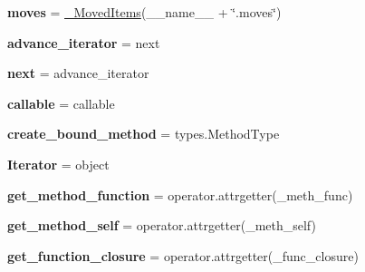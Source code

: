 \begin{DoxyCompactItemize}
\mbox{\label{namespacesetuptools_1_1__vendor_1_1six_aa576da7d145eb931842fccae3485b577}} 
{\bfseries moves} = \hyperlink{classsetuptools_1_1__vendor_1_1six_1_1___moved_items}{\+\_\+\+Moved\+Items}(\+\_\+\+\_\+name\+\_\+\+\_\+ + \char`\"{}.moves\char`\"{})
\item 
\mbox{\label{namespacesetuptools_1_1__vendor_1_1six_a095fbb8b34e358895d36999a87cdf374}} 
{\bfseries advance\+\_\+iterator} = next
\item 
\mbox{\label{namespacesetuptools_1_1__vendor_1_1six_ac7f0484b4e655ede4b52ca9442ae498f}} 
{\bfseries next} = advance\+\_\+iterator
\item 
\mbox{\label{namespacesetuptools_1_1__vendor_1_1six_ad65726eda446de9ea6f4036a61ea63af}} 
{\bfseries callable} = callable
\item 
\mbox{\label{namespacesetuptools_1_1__vendor_1_1six_aa2f3939cf1024da43126ad39b5ef5535}} 
{\bfseries create\+\_\+bound\+\_\+method} = types.\+Method\+Type
\item 
\mbox{\label{namespacesetuptools_1_1__vendor_1_1six_a6a5504ec97f5181aeb78dfb75a76d72a}} 
{\bfseries Iterator} = object
\item 
\mbox{\label{namespacesetuptools_1_1__vendor_1_1six_a77cf6051a99677cf053625527a4bb45f}} 
{\bfseries get\+\_\+method\+\_\+function} = operator.\+attrgetter(\+\_\+meth\+\_\+func)
\item 
\mbox{\label{namespacesetuptools_1_1__vendor_1_1six_a4620fcbec26cd3b86cfb63eeacb37cc6}} 
{\bfseries get\+\_\+method\+\_\+self} = operator.\+attrgetter(\+\_\+meth\+\_\+self)
\item 
\mbox{\label{namespacesetuptools_1_1__vendor_1_1six_a73e6d76f92d20eb8676db8a9cc32f207}} 
{\bfseries get\+\_\+function\+\_\+closure} = operator.\+attrgetter(\+\_\+func\+\_\+closure)
\item 

\end{DoxyCompactItemize}
